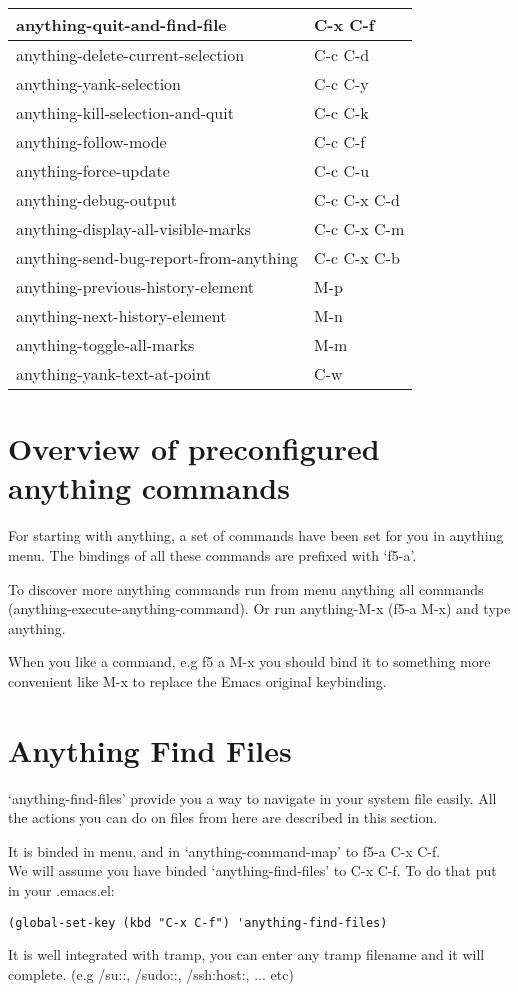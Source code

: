 \documentclass[a4paper,11pt]{article}
\begin{document}
\begin{tabular}{| l | m{5cm} |}
  \hline
  anything-quit-and-find-file & C-x C-f \\
  \hline
  anything-delete-current-selection & C-c C-d \\
  \hline
  anything-yank-selection & C-c C-y \\
  \hline
  anything-kill-selection-and-quit & C-c C-k \\
  \hline
  anything-follow-mode & C-c C-f \\
  \hline
  anything-force-update & C-c C-u \\
  \hline
  anything-debug-output & C-c C-x C-d \\
  \hline
  anything-display-all-visible-marks & C-c C-x C-m \\
  \hline
  anything-send-bug-report-from-anything & C-c C-x C-b \\
  \hline
  anything-previous-history-element & M-p \\
  \hline
  anything-next-history-element & M-n \\
  \hline
  anything-toggle-all-marks & M-m \\
  \hline
  anything-yank-text-at-point & C-w \\
  \hline
\end{tabular}
\section{Overview of preconfigured anything commands}
\label{sec:overv-comm-avail}
For starting with anything, a set of commands have been set for you in anything menu.
The bindings of all these commands are prefixed with `f5-a'.

To discover more anything commands run from menu anything all commands (anything-execute-anything-command).
Or run anything-M-x (f5-a M-x) and type anything.

When you like a command, e.g f5 a M-x you should bind it to something more convenient like M-x to replace the Emacs
original keybinding.

\section{Anything Find Files}
\label{sec:anything-find-files}
`anything-find-files' provide you a way to navigate in your system file easily.
All the actions you can do on files from here are described in this section.

It is binded in menu, and in `anything-command-map' to f5-a C-x C-f. \\
We will assume you have binded `anything-find-files' to C-x C-f.
To do that put in your .emacs.el:
\begin{verbatim}
(global-set-key (kbd "C-x C-f") 'anything-find-files)
\end{verbatim}
It is well integrated with tramp, you can enter any tramp filename and it will complete.
(e.g /su::, /sudo::, /ssh:host:, ... etc)
\end{document}
